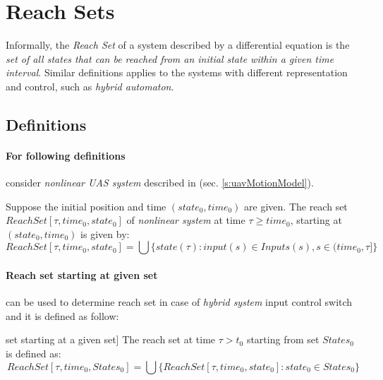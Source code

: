 \section{Reach Sets}\label{s:ReachSets}
    \noindent Informally, the \emph{Reach Set} of a system described by a differential equation is the \emph{set of all states that can be reached from an initial state within a given time interval}. Similar definitions applies to the systems with different representation and control, such as \emph{hybrid automaton}.


\subsection{Definitions}\label{sec:reachSetIncrementalDefinition}
    \paragraph{For following definitions} consider \emph{nonlinear UAS system} described in (sec. \ref{s:uavMotionModel}).
    
    \begin{definition}\label{def:reachset01}
        Suppose the initial position
        and time $(state_0, time_0)$ are given. The reach set $ReachSet[\tau, time_0, state_0]$ of \emph{nonlinear system} at time $\tau \ge time_0$, starting at $(state_0, time_0)$ is given by:
        \begin{equation}
            ReachSet[\tau, time_0, state_0] = \bigcup \{state(\tau):input(s)\in Inputs(s),s \in (time_0,\tau]\}
        \end{equation}
    \end{definition}
    
    \paragraph{Reach set starting at given set} can be used to determine reach set in case of \emph{hybrid system} input control switch and it is defined as follow:
    \begin{definition}\label{def:ReachSetBasic} set starting at a given set]
        The reach set at time $\tau > t_0$ starting from set $States_0$ is defined as:
        \begin{equation}
            ReachSet[\tau, time_0, States_0] = \bigcup \{ReachSet[\tau, time_0, state_0]: state_0 \in States_0\}
        \end{equation}
    \end{definition}

